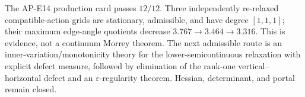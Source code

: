 The AP-E14 production card passes $12/12$.  Three independently re-relaxed
compatible-action grids are stationary, admissible, and have degree
$[1,1,1]$; their maximum edge-angle quotients decrease
$3.767\to3.464\to3.316$.  This is evidence, not a continuum Morrey theorem.
The next admissible route is an inner-variation/monotonicity theory for the
lower-semicontinuous relaxation with explicit defect measure, followed by
elimination of the rank-one vertical--horizontal defect and an
$\varepsilon$-regularity theorem.  Hessian, determinant, and portal remain
closed.
